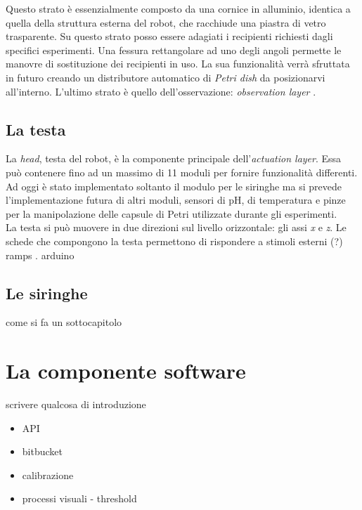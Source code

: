 Questo strato è essenzialmente composto da una cornice in alluminio, identica a quella della struttura esterna del robot, che racchiude una piastra di vetro trasparente. Su questo strato posso essere adagiati i recipienti richiesti dagli specifici esperimenti. Una fessura rettangolare ad uno degli angoli permette le manovre di sostituzione dei recipienti in uso. La sua funzionalità verrà sfruttata in futuro creando un distributore automatico di  \emph{Petri dish} da posizionarvi all'interno. 
L'ultimo strato è quello dell'osservazione: \emph{observation layer} .

\subsection{La testa}
\label{sec:00456}
La \emph{head}, testa del robot, è la componente principale dell'\emph{actuation layer}. Essa può contenere fino ad un massimo di 11 moduli per fornire funzionalità differenti. Ad oggi è stato implementato soltanto il modulo per le siringhe ma si prevede l'implementazione futura di altri moduli, sensori di pH, di temperatura e pinze per la manipolazione delle capsule di Petri utilizzate durante gli esperimenti. 
\\ La testa si può muovere in due direzioni sul livello orizzontale: gli assi \emph{x} e \emph{z}. Le schede che compongono la testa permettono di rispondere a stimoli esterni (?)
ramps . arduino

\subsection{Le siringhe}
\label{sec:01456}
come si fa un sottocapitolo

\section{La componente software}
\label{sec:123}
scrivere qualcosa di introduzione

\begin{itemize}
  \item API 
  \item bitbucket
  \item calibrazione
  \item processi visuali - threshold 
\end{itemize}


